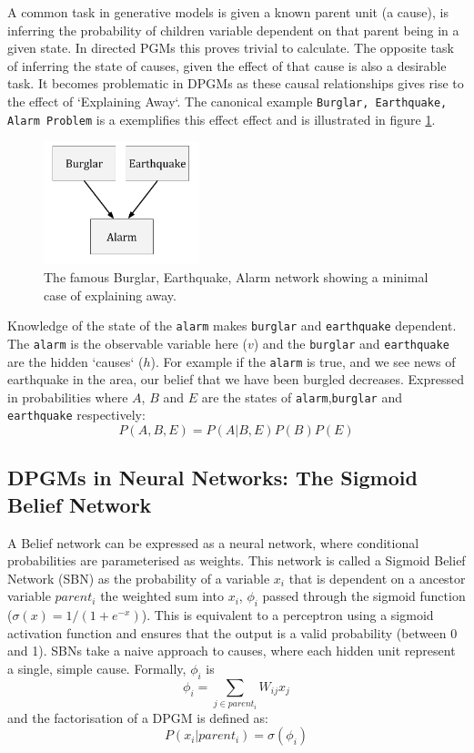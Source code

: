 A common task in generative models is given a known parent unit (a cause), is inferring the probability of children variable dependent on that parent being in a given state. In directed PGMs this proves trivial to calculate. The opposite task of inferring the state of causes, given the effect of that cause is also a desirable task\todocite{}. It becomes problematic in DPGMs as these causal relationships gives rise to the effect of `Explaining Away`. The canonical example \texttt{Burglar, Earthquake, Alarm Problem} is a exemplifies this effect effect\cite{Barber:2012:BRM:2207809} and is illustrated in figure \ref{F:Explaining-Away}.
\begin{figure}[h]
\begin{center}
  \includegraphics[width = 0.4\textwidth]{Assets/Explaining_Away.png}
\caption{The famous Burglar, Earthquake, Alarm network showing a minimal case of explaining away.}
\label{F:Explaining-Away}
\end{center}
\end{figure}
Knowledge of the state of the \texttt{alarm} makes \texttt{burglar} and \texttt{earthquake} dependent. The \texttt{alarm} is the observable variable here ($v$) and the \texttt{burglar} and \texttt{earthquake} are the hidden `causes` ($h$). For example if the \texttt{alarm} is true, and we see news of earthquake in the area, our belief that we have been burgled decreases. Expressed in probabilities where $A$, $B$ and $E$ are the states of \texttt{alarm},\texttt{burglar} and \texttt{earthquake} respectively:
$$
P(A,B,E) = P(A|B,E)P(B)P(E)
$$

\subsection{DPGMs in Neural Networks: The Sigmoid Belief Network}

A Belief network can be expressed as a neural network, where conditional probabilities are parameterised as weights. This network is called a Sigmoid Belief Network (SBN) as the probability of a variable $x_i$ that is dependent on a ancestor variable $parent_i$ the weighted sum into $x_i$, $\phi_i$ passed through the sigmoid function ($ \sigma(x)=1/(1+e^{-x})$). This is equivalent to a perceptron using a sigmoid activation function and ensures that the output is a valid probability (between 0 and 1).
SBNs take a naive approach to causes, where each hidden unit represent a single, simple cause. Formally, $\phi_i$ is
$$ \phi_i = \sum_{j \in parent_i} W_{ij}x_j$$
and the factorisation of a DPGM is defined as:
$$
P(x_i | parent_i) = \sigma(\phi_i)
$$

